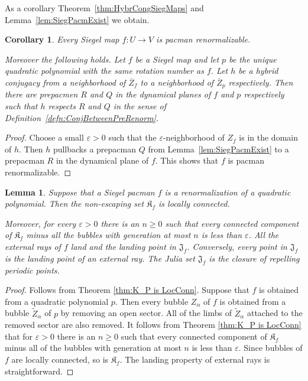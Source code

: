 \documentclass[]{amsart}
\newcommand\Jul{{\mathfrak J}}
\newcommand\Kfilled{{\mathfrak K}}
\newtheorem{cor}[thm]{Corollary}
\newtheorem{lem}[thm]{Lemma}
\theoremstyle{remark}
\numberwithin{equation}{section}
\theoremstyle{definition}
\begin{document}
As a corollary Theorem~\ref{thm:HybrCongSiegMaps} and Lemma~\ref{lem:SiegPacmExist}  we obtain. 
\begin{cor}
\label{cor:SP embeds in SM}
Every  Siegel map $f\colon U\to V$ is pacman renormalizable. 

Moreover the following holds. Let $f$ be a Siegel map and let $p$ be the unique quadratic polynomial with the same rotation number as $f$. Let $h$ be a hybrid conjugacy from a neighborhood of $\overline Z_f$ to a neighborhood of $\overline Z_p$ respectively. Then there are prepacmen $R$ and $Q$ in the dynamical planes of $f$ and $p$ respectively such that $h$ respects $R$ and $Q$ in the sense of Definition~\ref{defn:ConjBetweenPreRenorm}.
\end{cor}
\begin{proof}

 Choose a small $\varepsilon>0$ such that the  $\varepsilon$-neighborhood of $Z_f$ is in the domain of $h$. Then $h$ pullbacks a prepacman $Q$ from Lemma~\ref{lem:SiegPacmExist} to a prepacman $R$ in the dynamical plane of $f$. This shows that $f$ is pacman renormalizable.   
\end{proof}






\begin{lem}
\label{lem:thm:K_P is LocConn}
Suppose that a Siegel pacman $f$ is a renormalization of a quadratic polynomial. Then the non-escaping set $\Kfilled_f$ is locally connected. 

Moreover, for every $\varepsilon>0$ there is an $n\ge 0$ such that every connected component of $\Kfilled_f$ minus all the bubbles with generation at most $n$ is less than $\varepsilon$. All the external rays of $f$ land and the landing point in $\Jul_f$. Conversely, every point in $\Jul_f$ is the landing point of an external ray. The Julia set $\Jul_f$ is the closure of repelling periodic points.
\end{lem}
\begin{proof}
Follows from Theorem \ref{thm:K_P is LocConn}. Suppose that $f$ is obtained from a quadratic polynomial $p$. Then every bubble $Z_\alpha$ of $f$ is obtained from a bubble $\widetilde Z_\alpha$  of $p$ by removing an open sector. All of the limbs of $\widetilde Z_\alpha$ attached to the removed sector are also removed.  It follows from Theorem \ref{thm:K_P is LocConn} that for $\varepsilon>0$ there is an $n\ge 0$ such that every connected component of $\Kfilled_f$ minus all of the bubbles with generation at most $n$ is less than $\varepsilon$. Since bubbles of $f$ are locally connected, so is $\Kfilled_f$. The landing property of external rays is straightforward.  
\end{proof}
\end{document}
